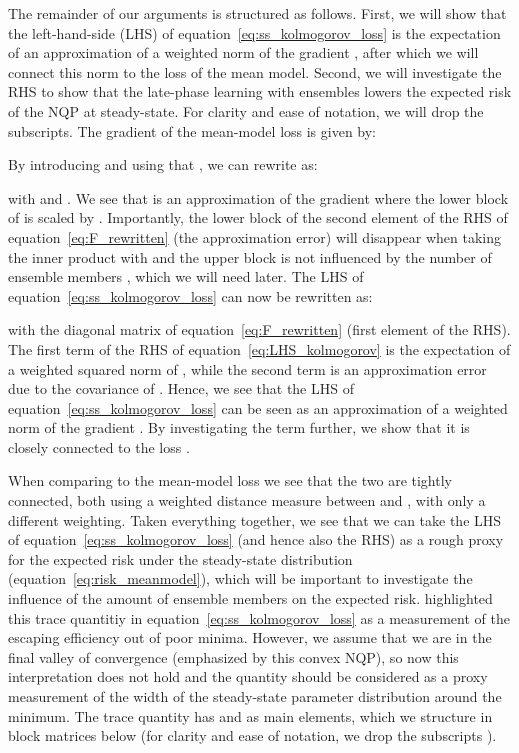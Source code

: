 \documentclass{article} \usepackage{iclr2021_conference,times}
\def\eqref#1{equation~\ref{#1}}
\begin{document}
The remainder of our arguments is structured as follows. First, we will show that the left-hand-side (LHS) of \eqref{eq:ss_kolmogorov_loss} is the expectation of an approximation of a weighted norm of the gradient , after which we will connect this norm to the loss  of the mean model. Second, we will investigate the RHS to show that the late-phase learning with ensembles lowers the expected risk of the NQP at steady-state. For clarity and ease of notation, we will drop the  subscripts. The gradient of the mean-model loss is given by: 

By introducing  and using that , we can rewrite  as: 

with  and . We see that  is an approximation of the gradient  where the lower block of  is scaled by . Importantly, the lower block of the second element of the RHS of \eqref{eq:F_rewritten} (the approximation error) will disappear when taking the inner product with  and the upper block is not influenced by the number of ensemble members , which we will need later. The LHS of \eqref{eq:ss_kolmogorov_loss} can now be rewritten as:

with  the diagonal matrix of \eqref{eq:F_rewritten} (first element of the RHS). The first term of the RHS of \eqref{eq:LHS_kolmogorov} is the expectation of a weighted squared norm of , while the second term is an approximation error due to the covariance of . Hence, we see that the LHS of \eqref{eq:ss_kolmogorov_loss} can be seen as an approximation of a weighted norm of the gradient . By investigating the term  further, we show that it is closely connected to the loss .

When comparing to the mean-model loss  we see that the two are tightly connected, both using a weighted distance measure between  and  , with only a different weighting. Taken everything together, we see that we can take the LHS of \eqref{eq:ss_kolmogorov_loss} (and hence also the RHS) as a rough proxy for the expected risk under the steady-state distribution (\eqref{eq:risk_meanmodel}), which will be important to investigate the influence of the amount of ensemble members on the expected risk. \citet{zhu_anisotropic_2018} highlighted this trace quantitiy in \eqref{eq:ss_kolmogorov_loss} as a measurement of the escaping efficiency out of poor minima. However, we assume that we are in the final valley of convergence (emphasized by this convex NQP), so now this interpretation does not hold and the quantity should be considered as a proxy measurement of the width of the steady-state parameter distribution around the minimum. The trace quantity has  and  as main elements, which we structure in block matrices below (for clarity and ease of notation, we drop the subscripts ).
\end{document}
